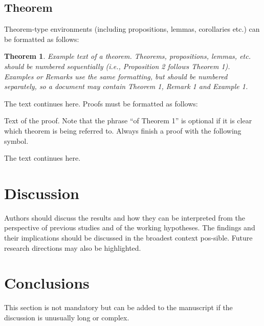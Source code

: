 \documentclass[11pt,a4paper]{article}
\makeatletter
\renewenvironment{proof}[1][\proofname]{\par
  \pushQED{\qed}%
  \normalfont \topsep6\p@\@plus6\p@\relax
  \trivlist
  \item[\hskip\labelsep \bfseries #1\@addpunct{.}]\ignorespaces
}{%
  \popQED\endtrivlist\@endpefalse
}
\theoremstyle{plain}
\newtheorem{theorem}{Theorem}
\theoremstyle{definition}
\makeatother
\begin{document}
\subsection{Theorem}
Theorem-type environments (including propositions, lemmas, corollaries etc.) can be formatted as follows:

\begin{theorem}
Example text of a theorem. Theorems, propositions, lemmas, etc. should be numbered sequentially (i.e., Proposition 2 follows Theorem 1). Examples or Remarks use the same formatting, but should be numbered separately, so a document may contain Theorem 1, Remark 1 and Example 1.
\end{theorem}

The text continues here. Proofs must be formatted as follows:

\begin{proof}[Proof of Theorem 1]
Text of the proof. Note that the phrase ``of Theorem 1'' is optional if it is clear which theorem is being referred to. Always finish a proof with the following symbol.
\end{proof}

The text continues here.

\section{Discussion}
Authors should discuss the results and how they can be interpreted from the perspective of previous studies and of the working hypotheses. The findings and their implications should be discussed in the broadest context pos-sible. Future research directions may also be highlighted.

\section{Conclusions}
This section is not mandatory but can be added to the manuscript if the discussion is unusually long or complex.
\end{document}
